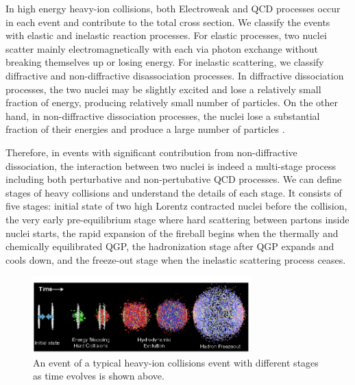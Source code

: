 In high energy heavy-ion collisions, both Electroweak and QCD processes occur in each event and contribute to the total cross section. We classify the events with elastic and inelastic reaction processes. For elastic processes, two nuclei scatter mainly electromagnetically with each via photon exchange without breaking themselves up or losing energy. For inelastic scattering, we classify diffractive and non-diffractive disassociation processes. In diffractive dissociation processes, the two nuclei may be slightly excited and lose a relatively small fraction of energy, producing relatively small number of particles. On the other hand, in non-diffractive dissociation processes, the nuclei lose a substantial fraction of their energies and produce a large number of particles \cite{CYWong}. 

Therefore, in events with significant contribution from non-diffractive dissociation, the interaction between two nuclei is indeed a multi-stage process including both perturbative and non-pertubative QCD processes. We can define stages of heavy collisions and understand the details of each stage. It consists of five stages: initial state of two high Lorentz contracted nuclei before the collision, the very early pre-equilibrium stage where hard scattering between partons inside nuclei starts, the rapid expansion of the fireball begins when the thermally and chemically equilibrated QGP, the hadronization stage after QGP expands and cools down, and the freeze-out stage when the inelastic scattering process ceases.


\begin{figure}[hbtp]
\begin{center}
\includegraphics[width=0.75\textwidth]{Figures/Chapter1/Heavy-Ion-Process.png}
\caption{An event of a typical heavy-ion collisions event with different stages as time evolves is shown above.}
\label{CERNAccComplex}
\end{center}
\end{figure} 

